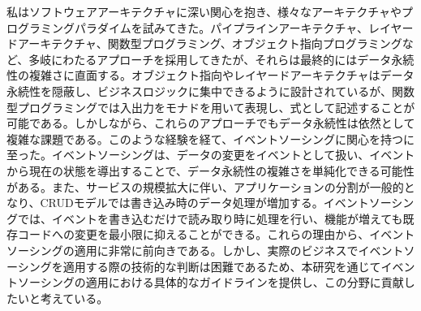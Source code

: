 \documentclass[../../main]{subfiles}
\begin{document}
    私はソフトウェアアーキテクチャに深い関心を抱き、様々なアーキテクチャやプログラミングパラダイムを試みてきた。パイプラインアーキテクチャ、レイヤードアーキテクチャ、関数型プログラミング、オブジェクト指向プログラミングなど、多岐にわたるアプローチを採用してきたが、それらは最終的にはデータ永続性の複雑さに直面する。オブジェクト指向やレイヤードアーキテクチャはデータ永続性を隠蔽し、ビジネスロジックに集中できるように設計されているが、関数型プログラミングでは入出力をモナドを用いて表現し、式として記述することが可能である。しかしながら、これらのアプローチでもデータ永続性は依然として複雑な課題である。このような経験を経て、イベントソーシングに関心を持つに至った。イベントソーシングは、データの変更をイベントとして扱い、イベントから現在の状態を導出することで、データ永続性の複雑さを単純化できる可能性がある。また、サービスの規模拡大に伴い、アプリケーションの分割が一般的となり、CRUDモデルでは書き込み時のデータ処理が増加する。イベントソーシングでは、イベントを書き込むだけで読み取り時に処理を行い、機能が増えても既存コードへの変更を最小限に抑えることができる。これらの理由から、イベントソーシングの適用に非常に前向きである。しかし、実際のビジネスでイベントソーシングを適用する際の技術的な判断は困難であるため、本研究を通じてイベントソーシングの適用における具体的なガイドラインを提供し、この分野に貢献したいと考えている。

    \clearpage
\end{document}
